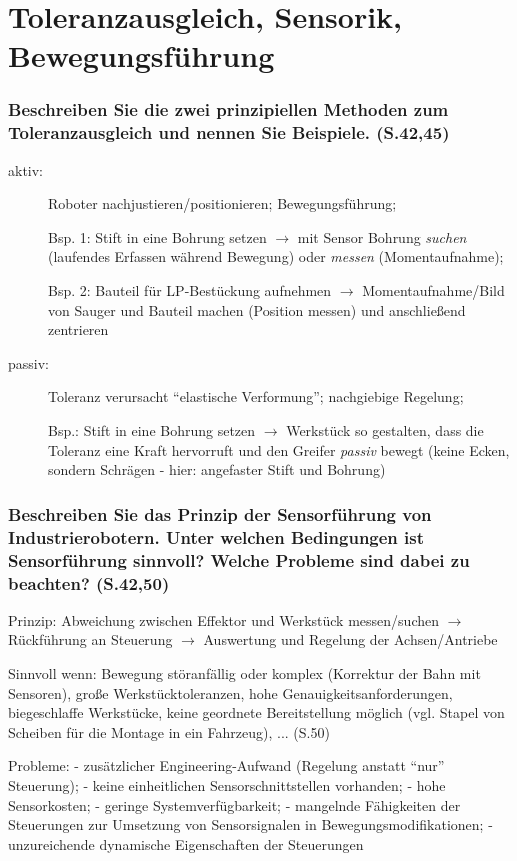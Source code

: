 \documentclass[12pt,a4paper,titlepage,oneside]{article}
\begin{document}
\section{Toleranzausgleich, Sensorik, Bewegungsführung}

\subsubsection*{Beschreiben Sie die zwei prinzipiellen Methoden zum Toleranzausgleich und 
  nennen Sie Beispiele. (S.42,45)}
\begin{description}
\item[aktiv:] Roboter nachjustieren/positionieren; Bewegungsführung; 

  Bsp. 1: Stift in eine
  Bohrung setzen $\rightarrow$ mit Sensor Bohrung \emph{suchen} (laufendes Erfassen während 
  Bewegung) oder \emph{messen} (Momentaufnahme); 

  Bsp. 2: Bauteil für LP-Bestückung aufnehmen
  $\rightarrow$ Momentaufnahme/Bild von Sauger und Bauteil machen (Position messen) und 
  anschließend zentrieren
\item[passiv:] Toleranz verursacht ``elastische Verformung''; nachgiebige Regelung; 

  Bsp.: Stift in eine Bohrung
  setzen $\rightarrow$ Werkstück so gestalten, dass die Toleranz eine Kraft hervorruft und 
  den Greifer \emph{passiv} bewegt (keine Ecken, sondern Schrägen - hier: angefaster Stift
  und Bohrung)
\end{description}

\subsubsection*{Beschreiben Sie das Prinzip der Sensorführung von Industrierobotern. Unter
  welchen Bedingungen ist Sensorführung sinnvoll? Welche Probleme sind dabei zu beachten? 
  (S.42,50)}
Prinzip: Abweichung zwischen Effektor und Werkstück messen/suchen $\rightarrow$ Rückführung
an Steuerung $\rightarrow$ Auswertung und Regelung der Achsen/Antriebe

Sinnvoll wenn: Bewegung störanfällig oder komplex (Korrektur der Bahn mit Sensoren), 
große Werkstücktoleranzen, hohe Genauigkeitsanforderungen, biegeschlaffe Werkstücke, 
keine geordnete Bereitstellung möglich (vgl. Stapel von Scheiben für die Montage in ein
Fahrzeug), ... (S.50)

Probleme: - zusätzlicher Engineering-Aufwand (Regelung anstatt ``nur'' Steuerung); - keine
einheitlichen Sensorschnittstellen vorhanden; - hohe Sensorkosten; - geringe 
Systemverfügbarkeit; - mangelnde Fähigkeiten der Steuerungen zur Umsetzung von
Sensorsignalen in Bewegungsmodifikationen; - unzureichende dynamische Eigenschaften der 
Steuerungen
\end{document}

